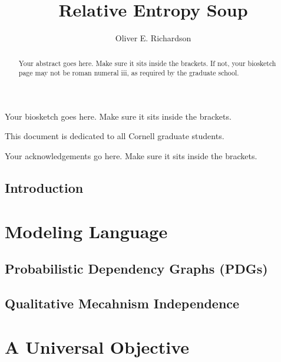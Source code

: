 \documentclass[tocprelim,
    ]{cornellmodified}
\title {%
    Relative Entropy Soup
}
\author {Oliver E. Richardson}
\begin{document}
\maketitle
\makecopyright

\begin{abstract}
Your abstract goes here. Make sure it sits inside the brackets. If not,
your biosketch page may not be roman numeral iii, as required by the
graduate school.
\end{abstract}

\begin{biosketch}
Your biosketch goes here. Make sure it sits inside
the brackets.
\end{biosketch}

\begin{dedication}
This document is dedicated to all Cornell graduate students.
\end{dedication}

\begin{acknowledgements}
Your acknowledgements go here. Make sure it sits inside the brackets.
\end{acknowledgements}

\contentspage
\tablelistpage
\figurelistpage

\normalspacing \setcounter{page}{1} 
\pagestyle{cornell} \addtolength{\parskip}{0.5\baselineskip}


\chapter{Introduction}

\part{Modeling Language}

\chapter{Probabilistic Dependency Graphs (PDGs)} 
    
\chapter{Qualitative Mecahnism Independence}

\part{A Universal Objective}
\end{document}
